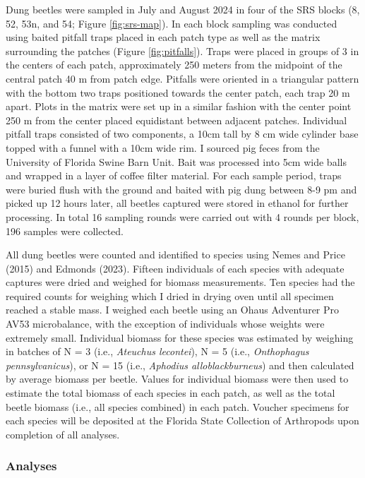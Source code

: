 \documentclass[
  man, donotrepeattitle]{apa6}
\begin{document}
Dung beetles were sampled in July and August 2024 in four of the SRS blocks (8, 52, 53n, and 54; Figure \ref{fig:srs-map}). In each block sampling was conducted using baited pitfall traps placed in each patch type as well as the matrix surrounding the patches (Figure \ref{fig:pitfalls}). Traps were placed in groups of 3 in the centers of each patch, approximately 250 meters from the midpoint of the central patch 40 m from patch edge. Pitfalls were oriented in a triangular pattern with the bottom two traps positioned towards the center patch, each trap 20 m apart. Plots in the matrix were set up in a similar fashion with the center point 250 m from the center placed equidistant between adjacent patches. Individual pitfall traps consisted of two components, a 10cm tall by 8 cm wide cylinder base topped with a funnel with a 10cm wide rim. I sourced pig feces from the University of Florida Swine Barn Unit. Bait was processed into 5cm wide balls and wrapped in a layer of coffee filter material. For each sample period, traps were buried flush with the ground and baited with pig dung between 8-9 pm and picked up 12 hours later, all beetles captured were stored in ethanol for further processing. In total 16 sampling rounds were carried out with 4 rounds per block, 196 samples were collected.

All dung beetles were counted and identified to species using Nemes and Price (2015) and Edmonds (2023). Fifteen individuals of each species with adequate captures were dried and weighed for biomass measurements. Ten species had the required counts for weighing which I dried in drying oven until all specimen reached a stable mass. I weighed each beetle using an Ohaus Adventurer Pro AV53 microbalance, with the exception of individuals whose weights were extremely small. Individual biomass for these species was estimated by weighing in batches of N = 3 (i.e., \emph{Ateuchus lecontei}), N = 5 (i.e., \emph{Onthophagus pennsylvanicus}), or N = 15 (i.e., \emph{Aphodius alloblackburneus}) and then calculated by average biomass per beetle. Values for individual biomass were then used to estimate the total biomass of each species in each patch, as well as the total beetle biomass (i.e., all species combined) in each patch. Voucher specimens for each species will be deposited at the Florida State Collection of Arthropods upon completion of all analyses.

\subsubsection{Analyses}\label{analyses}
\end{document}
